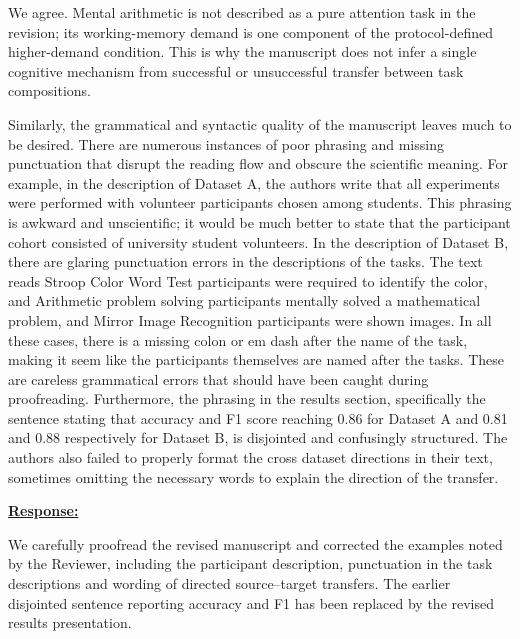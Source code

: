 \documentclass{article}
\begin{document}
We agree. Mental arithmetic is not described as a pure attention task in the
revision; its working-memory demand is one component of the protocol-defined
higher-demand condition. This is why the manuscript does not infer a single
cognitive mechanism from successful or unsuccessful transfer between task
compositions.

\vspace{0.3cm}


\begin{cmt}{}{}

Similarly, the grammatical and syntactic quality of the manuscript leaves much
to be desired. There are numerous instances of poor phrasing and missing
punctuation that disrupt the reading flow and obscure the scientific meaning.
For example, in the description of Dataset A, the authors write that all
experiments were performed with volunteer participants chosen among students.
This phrasing is awkward and unscientific; it would be much better to state that
the participant cohort consisted of university student volunteers. In the
description of Dataset B, there are glaring punctuation errors in the
descriptions of the tasks. The text reads Stroop Color Word Test participants
were required to identify the color, and Arithmetic problem solving participants
mentally solved a mathematical problem, and Mirror Image Recognition
participants were shown images. In all these cases, there is a missing colon or
em dash after the name of the task, making it seem like the participants
themselves are named after the tasks. These are careless grammatical errors that
should have been caught during proofreading. Furthermore, the phrasing in the
results section, specifically the sentence stating that accuracy and F1 score
reaching 0.86 for Dataset A and 0.81 and 0.88 respectively for Dataset B, is
disjointed and confusingly structured. The authors also failed to properly
format the cross dataset directions in their text, sometimes omitting the
necessary words to explain the direction of the transfer.

\end{cmt}
\vspace{0.1cm}
\noindent
\underline{\textbf{Response:}}
\vspace{0.2cm}

We carefully proofread the revised manuscript and corrected the examples noted
by the Reviewer, including the participant description, punctuation in the task
descriptions and wording of directed source--target transfers. The earlier
disjointed sentence reporting accuracy and F1 has been replaced by the revised
results presentation.
\end{document}
